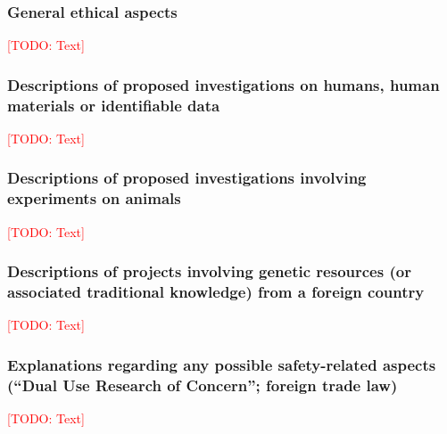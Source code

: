 \documentclass[american,firsttime]{dfgproposal}
\newcommand{\todo}[1]{\xspace{\textcolor{red}{[TODO: #1]}}\xspace}
\begin{document}
	\subsubsection{General ethical aspects}
	\todo{Text}
	
	\subsubsection{Descriptions of proposed investigations on humans, human materials or identifiable data}
	\todo{Text}
	
	\subsubsection{Descriptions of proposed investigations involving experiments on animals}
	\todo{Text}
	
	\subsubsection{Descriptions of projects involving genetic resources (or associated traditional knowledge) from a foreign country}
	\todo{Text}
	
	\subsubsection{Explanations regarding any possible safety-related aspects (\enquote{Dual Use Research of Concern}; foreign trade law)}
	\todo{Text}
	
\end{document}
